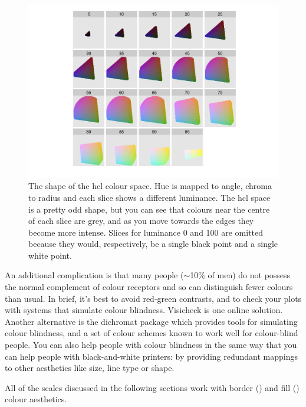 \begin{figure}[htbp]
  \centering
    \includegraphics[width=\linewidth]{hcl-space}
  \caption{The shape of the hcl colour space.  Hue is mapped to angle, chroma to radius and each slice shows a different luminance.  The hcl space is a pretty odd shape, but you can see that colours near the centre of each slice are grey, and as you move towards the edges they become more intense.  Slices for luminance 0 and 100 are omitted because they would, respectively, be a single black point and a single white point.}
  \label{fig:hcl}
\end{figure}

An additional complication is that many people ($\sim$10\% of men) do not possess the normal complement of colour receptors and so can distinguish fewer colours than usual.  In brief, it's best to avoid red-green contrasts, and to check your plots with systems that simulate colour blindness. Visicheck is one online solution. Another alternative is the dichromat package \citep{dichromat} which provides tools for simulating colour blindness, and a set of colour schemes known to work well for colour-blind people. You can also help people with colour blindness in the same way that you can help people with black-and-white printers: by providing redundant mappings to other aesthetics like size, line type or shape.

All of the scales discussed in the following sections work with border () and fill () colour aesthetics.


